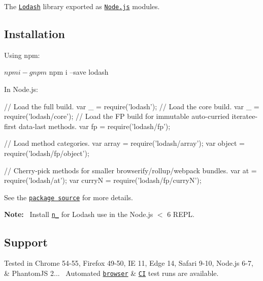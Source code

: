 The \href{https://lodash.com/}{\tt Lodash} library exported as \href{https://nodejs.org/}{\tt Node.\+js} modules.

\subsection*{Installation}

Using npm\+: 
\begin{DoxyCode}
$ npm i -g npm
$ npm i --save lodash
\end{DoxyCode}


In Node.\+js\+: 
\begin{DoxyCode}
// Load the full build.
var \_ = require('lodash');
// Load the core build.
var \_ = require('lodash/core');
// Load the FP build for immutable auto-curried iteratee-first data-last methods.
var fp = require('lodash/fp');

// Load method categories.
var array = require('lodash/array');
var object = require('lodash/fp/object');

// Cherry-pick methods for smaller browserify/rollup/webpack bundles.
var at = require('lodash/at');
var curryN = require('lodash/fp/curryN');
\end{DoxyCode}


See the \href{https://github.com/lodash/lodash/tree/4.17.4-npm}{\tt package source} for more details.

{\bfseries Note\+:}~\newline
 Install \href{https://www.npmjs.com/package/n_}{\tt n\+\_\+} for Lodash use in the Node.\+js $<$ 6 R\+E\+PL.

\subsection*{Support}

Tested in Chrome 54-\/55, Firefox 49-\/50, IE 11, Edge 14, Safari 9-\/10, Node.\+js 6-\/7, \& Phantom\+JS 2...~\newline
 Automated \href{https://saucelabs.com/u/lodash}{\tt browser} \& \href{https://travis-ci.org/lodash/lodash/}{\tt CI} test runs are available. 